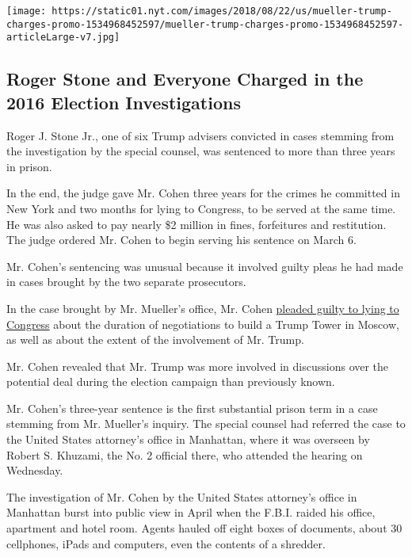 \texttt{[image: https://static01.nyt.com/images/2018/08/22/us/mueller-trump-charges-promo-1534968452597/mueller-trump-charges-promo-1534968452597-articleLarge-v7.jpg]}

\hypertarget{roger-stone-and-everyone-charged-in-the-2016-election-investigations}{%
\subsection{Roger Stone and Everyone Charged in the 2016 Election
Investigations}\label{roger-stone-and-everyone-charged-in-the-2016-election-investigations}}

Roger J. Stone Jr., one of six Trump advisers convicted in cases
stemming from the investigation by the special counsel, was sentenced to
more than three years in prison.

In the end, the judge gave Mr. Cohen three years for the crimes he
committed in New York and two months for lying to Congress, to be served
at the same time. He was also asked to pay nearly \$2 million in fines,
forfeitures and restitution. The judge ordered Mr. Cohen to begin
serving his sentence on March 6.

Mr. Cohen's sentencing was unusual because it involved guilty pleas he
had made in cases brought by the two separate prosecutors.

In the case brought by Mr. Mueller's office, Mr. Cohen
\href{https://www.nytimes.com/2018/11/29/nyregion/michael-cohen-trump-russia-mueller.html}{pleaded
guilty to lying to Congress} about the duration of negotiations to build
a Trump Tower in Moscow, as well as about the extent of the involvement
of Mr. Trump.

Mr. Cohen revealed that Mr. Trump was more involved in discussions over
the potential deal during the election campaign than previously known.

Mr. Cohen's three-year sentence is the first substantial prison term in
a case stemming from Mr. Mueller's inquiry. The special counsel had
referred the case to the United States attorney's office in Manhattan,
where it was overseen by Robert S. Khuzami, the No. 2 official there,
who attended the hearing on Wednesday.

The investigation of Mr. Cohen by the United States attorney's office in
Manhattan burst into public view in April when the F.B.I. raided his
office, apartment and hotel room. Agents hauled off eight boxes of
documents, about 30 cellphones, iPads and computers, even the contents
of a shredder.

